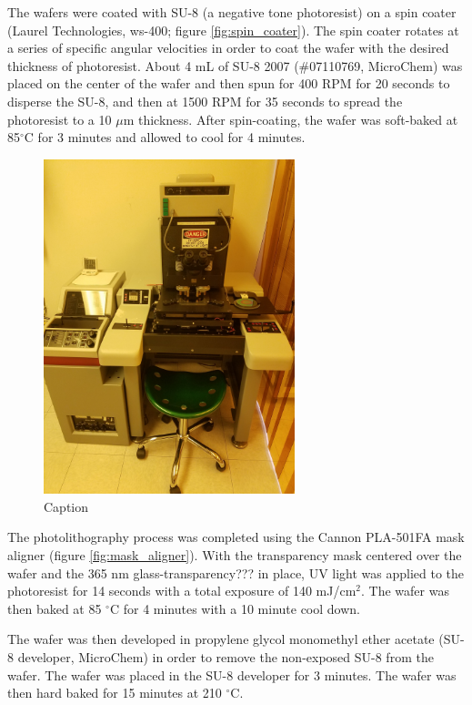 \par The wafers were coated with SU-8 (a negative tone photoresist) on a spin coater (Laurel Technologies, ws-400; figure \ref{fig:spin_coater}). The spin coater rotates at a series of specific angular velocities in order to coat the wafer with the desired thickness of photoresist. About 4 mL of SU-8 2007 (\#07110769, MicroChem) was placed on the center of the wafer and then spun for 400 RPM for 20 seconds to disperse the SU-8, and then at 1500 RPM for 35 seconds to spread the photoresist to a 10 $\mu$m thickness. After spin-coating, the wafer was soft-baked at 85$^\circ$C for 3 minutes and allowed to cool for 4 minutes.

\begin{figure}[h]
    \centering
    \includegraphics[angle=-90,origin=c,width=0.65\textwidth]{images/aligner.jpg}
    \caption{Caption}
    \label{fig:my_label}
\end{figure}

\par The photolithography process was completed using the Cannon PLA-501FA mask aligner (figure \ref{fig:mask_aligner}). With the transparency mask centered over the wafer and the 365 nm glass-transparency??? in place, UV light was applied to the photoresist for 14 seconds with a total exposure of 140 mJ/cm$^2$. The wafer was then baked at 85 $^\circ$C for 4 minutes with a 10 minute cool down. 

\par The wafer was then developed in propylene glycol monomethyl ether acetate (SU-8 developer, MicroChem) in order to remove the non-exposed SU-8 from the wafer. The wafer was placed in the SU-8 developer for 3 minutes. The wafer was then hard baked for 15 minutes at 210 $^\circ$C. 

